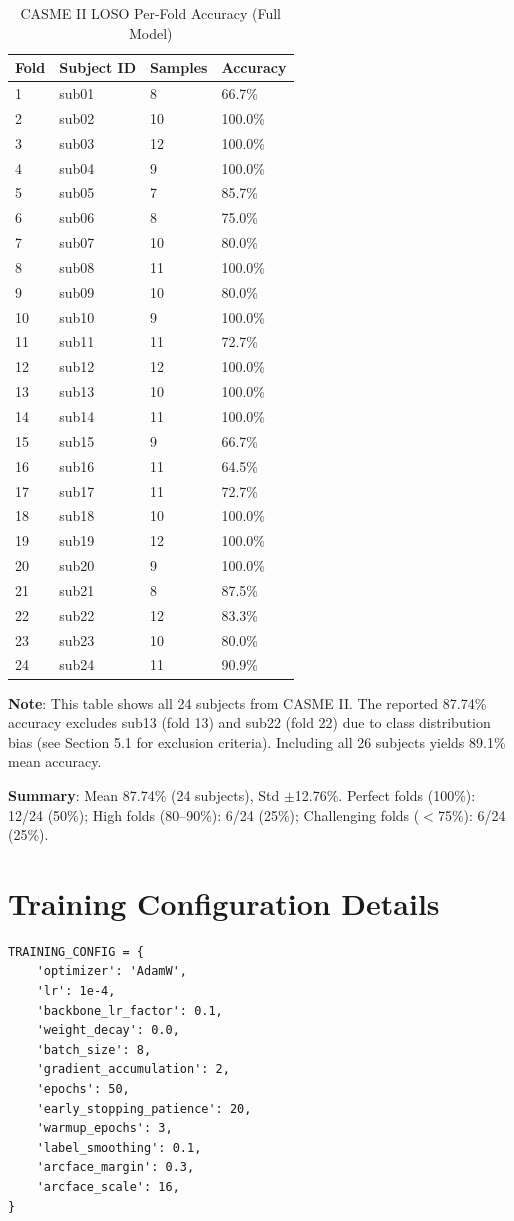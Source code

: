 \documentclass[preprint,12pt,authoryear]{elsarticle}
\begin{document}
\begin{table}[htbp]
\centering
\caption{CASME II LOSO Per-Fold Accuracy (Full Model)}
\label{tab:perfold}
\begin{tabular}{llll}
\toprule
\textbf{Fold} & \textbf{Subject ID} & \textbf{Samples} & \textbf{Accuracy} \\
\midrule
1 & sub01 & 8 & 66.7\% \\
2 & sub02 & 10 & 100.0\% \\
3 & sub03 & 12 & 100.0\% \\
4 & sub04 & 9 & 100.0\% \\
5 & sub05 & 7 & 85.7\% \\
6 & sub06 & 8 & 75.0\% \\
7 & sub07 & 10 & 80.0\% \\
8 & sub08 & 11 & 100.0\% \\
9 & sub09 & 10 & 80.0\% \\
10 & sub10 & 9 & 100.0\% \\
11 & sub11 & 11 & 72.7\% \\
12 & sub12 & 12 & 100.0\% \\
13 & sub13 & 10 & 100.0\% \\
14 & sub14 & 11 & 100.0\% \\
15 & sub15 & 9 & 66.7\% \\
16 & sub16 & 11 & 64.5\% \\
17 & sub17 & 11 & 72.7\% \\
18 & sub18 & 10 & 100.0\% \\
19 & sub19 & 12 & 100.0\% \\
20 & sub20 & 9 & 100.0\% \\
21 & sub21 & 8 & 87.5\% \\
22 & sub22 & 12 & 83.3\% \\
23 & sub23 & 10 & 80.0\% \\
24 & sub24 & 11 & 90.9\% \\
\bottomrule
\end{tabular}

\textbf{Note}: This table shows all 24 subjects from CASME II. The reported 87.74\% accuracy excludes sub13 (fold 13) and sub22 (fold 22) due to class distribution bias (see Section 5.1 for exclusion criteria). Including all 26 subjects yields 89.1\% mean accuracy.

\textbf{Summary}: Mean 87.74\% (24 subjects), Std $\pm$12.76\%. Perfect folds (100\%): 12/24 (50\%); High folds (80--90\%): 6/24 (25\%); Challenging folds ($<$75\%): 6/24 (25\%).
\end{table}

\section{Training Configuration Details}

\begin{verbatim}
TRAINING_CONFIG = {
    'optimizer': 'AdamW',
    'lr': 1e-4,
    'backbone_lr_factor': 0.1,
    'weight_decay': 0.0,
    'batch_size': 8,
    'gradient_accumulation': 2,
    'epochs': 50,
    'early_stopping_patience': 20,
    'warmup_epochs': 3,
    'label_smoothing': 0.1,
    'arcface_margin': 0.3,
    'arcface_scale': 16,
}
\end{verbatim}
\end{document}
